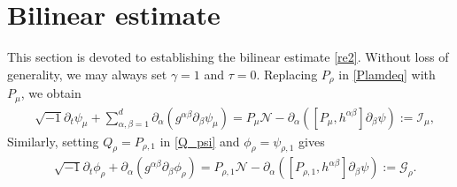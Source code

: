 \documentclass[11pt,letterpaper,reqno]{amsart}
\numberwithin{equation}{section}
\theoremstyle{definition}
\theoremstyle{remark}
\newcommand{\pa}{\partial}
\begin{document}
\section{Bilinear estimate} \label{sectBi}
This section is devoted to establishing the bilinear estimate \eqref{re2}. Without loss of generality, we may always set $ \gamma =1 $ and $\tau=0.$
Replacing $ P_\rho $ in \eqref{Plamdeq} with $ P_\mu $, we obtain
\begin{align} 
	&\sqrt{-1} \pa_t \psi_\mu +\sum_{\alpha,\beta=1}^d \partial_{\alpha} (g^{\alpha \beta} \partial_{ \beta}  \psi_\mu )=P_\mu \mathcal{N}- \partial_{\alpha}  ( [P_\mu, h^{\alpha \beta} ]  \partial_\beta  \psi ):= \mathcal{I}_\mu,	\label{PMeq}
\end{align}
 Similarly, 
 setting  $ Q_\rho =P_{\rho ,1}  $ in \eqref{Q_psi} and $\phi_\rho = \psi_{\rho, 1}$    gives 
 \begin{align} 
	&\sqrt{-1} \partial_t \phi_\rho  +  \partial_{\alpha}  (g^{\alpha \beta}  \partial_{\beta}\phi_\rho  ) = P_{\rho,1} \mathcal{N} -  \partial_{\alpha}  ( [P_{\rho,1}, h^{\alpha\beta} ]   \partial_{ \beta} \psi  )  
 	:= \mathcal{G}_\rho. \label{phiNeq}
\end{align}
\end{document}
